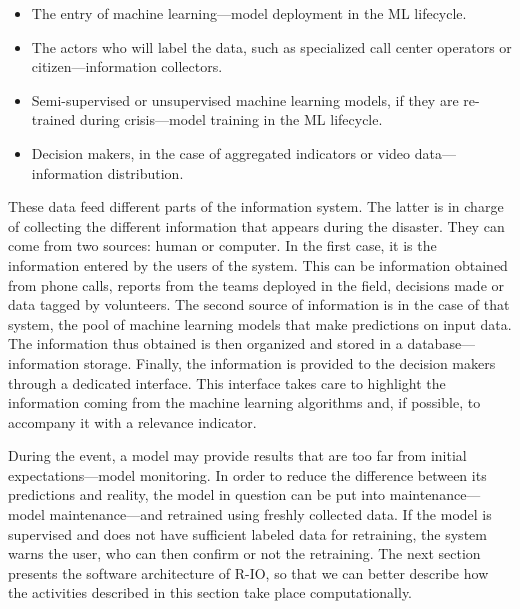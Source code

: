 \begin{itemize}
    \item The entry of machine learning—model deployment in the ML lifecycle.
    \item The actors who will label the data, such as specialized call center operators or citizen—information collectors.
    \item Semi-supervised or unsupervised machine learning models, if they are re-trained during crisis—model training in the ML lifecycle.
    \item Decision makers, in the case of aggregated indicators or video data—information distribution.
\end{itemize}

These data feed different parts of the information system.
The latter is in charge of collecting the different information that appears during the disaster.
They can come from two sources: human or computer.
In the first case, it is the information entered by the users of the system.
This can be information obtained from phone calls, reports from the teams deployed in the field, decisions made or data tagged by volunteers.
The second source of information is in the case of that system, the pool of machine learning models that make predictions on input data.
The information thus obtained is then organized and stored in a database—information storage.
Finally, the information is provided to the decision makers through a dedicated interface.
This interface takes care to highlight the information coming from the machine learning algorithms and, if possible, to accompany it with a relevance indicator.

During the event, a model may provide results that are too far from initial expectations—model monitoring.
In order to reduce the difference between its predictions and reality, the model in question can be put into maintenance—model maintenance—and retrained using freshly collected data.
If the model is supervised and does not have sufficient labeled data for retraining, the system warns the user, who can then confirm or not the retraining.
The next section presents the software architecture of R-IO, so that we can better describe how the activities described in this section take place computationally.

